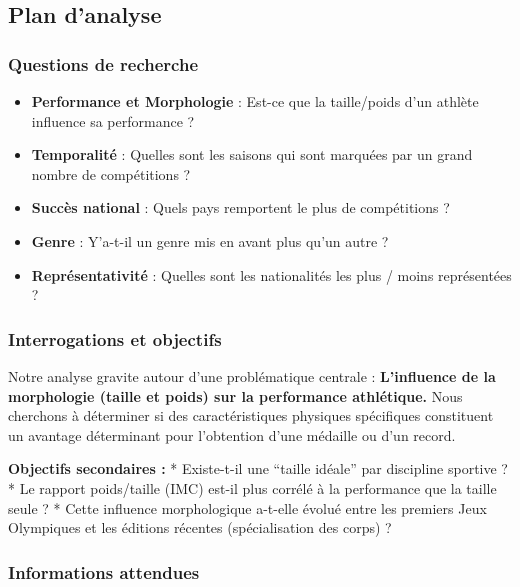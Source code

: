 \documentclass[
]{article}
\providecommand{\tightlist}{%
  \setlength{\itemsep}{0pt}\setlength{\parskip}{0pt}}
\begin{document}
\subsection{Plan d'analyse}\label{plan-danalyse}

\subsubsection{Questions de recherche}\label{questions-de-recherche}

\begin{itemize}
\tightlist
\item
  \textbf{Performance et Morphologie} : Est-ce que la taille/poids d'un
  athlète influence sa performance ?
\item
  \textbf{Temporalité} : Quelles sont les saisons qui sont marquées par
  un grand nombre de compétitions ?
\item
  \textbf{Succès national} : Quels pays remportent le plus de
  compétitions ?
\item
  \textbf{Genre} : Y'a-t-il un genre mis en avant plus qu'un autre ?
\item
  \textbf{Représentativité} : Quelles sont les nationalités les plus /
  moins représentées ?
\end{itemize}

\subsubsection{Interrogations et
objectifs}\label{interrogations-et-objectifs}

Notre analyse gravite autour d'une problématique centrale :
\textbf{L'influence de la morphologie (taille et poids) sur la
performance athlétique.} Nous cherchons à déterminer si des
caractéristiques physiques spécifiques constituent un avantage
déterminant pour l'obtention d'une médaille ou d'un record.

\textbf{Objectifs secondaires :} * Existe-t-il une ``taille idéale'' par
discipline sportive ? * Le rapport poids/taille (IMC) est-il plus
corrélé à la performance que la taille seule ? * Cette influence
morphologique a-t-elle évolué entre les premiers Jeux Olympiques et les
éditions récentes (spécialisation des corps) ?

\subsubsection{Informations attendues}\label{informations-attendues}
\end{document}
